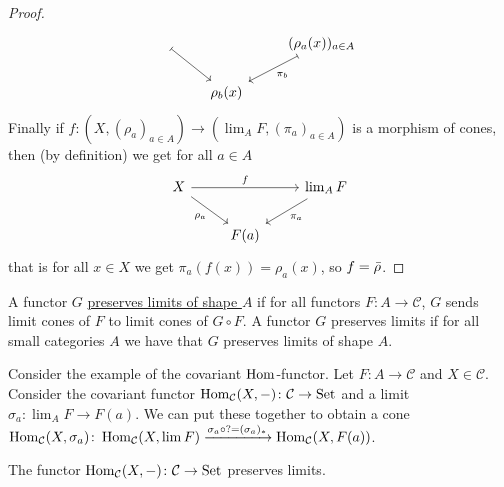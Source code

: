 \begin{proof}
\[\begin{tikzcd}
        \arrow[rd , mapsto]
        &
        &
        (\rho_a(x))_{a \in A}
        \arrow[ld, mapsto , "\pi_b"]
        \\
        &
        \rho_b(x)
        &
    \end{tikzcd}
    \]
    Finally if $f\colon ( X , ( \rho_a )_{a \in A}) \to ( \lim_A F , (\pi_a)_{a \in A})$ is a morphism of cones, then (by definition) we get for all $a \in A$ 
    \[
    \begin{tikzcd}
        X
        \arrow[rr, "f"]
        \arrow[rd, "\rho_a"']
        &
        &
        \lim_A F
        \arrow[ld, "\pi_a"]
        \\
        &
        F(a)
        &
    \end{tikzcd}
    \]
    that is for all $x \in X$ we get $\pi_a(f(x)) = \rho_a(x)$, so $f= \Bar{\rho}$.
\end{proof}

\begin{defi}
    A functor $G$ \underline{preserves limits of shape $A$} if for all functors $F\colon A \to \mathcal{C}$, $G$ sends limit cones of $F$ to limit cones of $G \circ F$. 
    A functor $G$ preserves limits if for all small categories $A$ we have that $G$ preserves limits of shape $A$.
\end{defi}

\begin{rmk}
    Consider the example of the covariant $\operatorname{Hom}$-functor.
     Let $F \colon  A \to \mathcal{C}$ and $X\in \mathcal{C}$.
     Consider the covariant functor $\operatorname{Hom}_{\mathcal{C}}(X,-) \colon \mathcal{C} \to \operatorname{Set}$ and a limit $\sigma_a\colon \lim_A F \to F(a)$.
     We can put these together to obtain a cone $\operatorname{Hom}_{\mathcal{C}}(X, \sigma_a) \colon \operatorname{Hom}_{\mathcal{C}}(X, \lim F) \xrightarrow{\sigma_a \circ ?=(\sigma_a)_*} \operatorname{Hom}_{\mathcal{C}}(X,F(a))$.
\end{rmk}

\begin{thm}
\label{covariant_hom_preserves_limits}
    The functor $\operatorname{Hom}_{\mathcal{C}}(X,-) \colon \mathcal{C} \to \operatorname{Set}$ preserves limits.
\end{thm}

